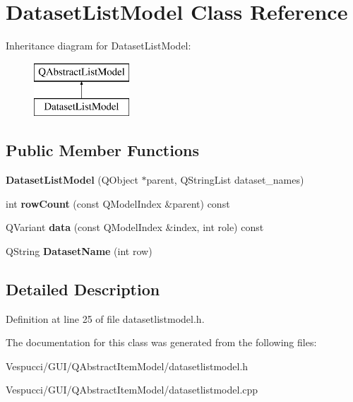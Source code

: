 \hypertarget{class_dataset_list_model}{}\section{Dataset\+List\+Model Class Reference}
\label{class_dataset_list_model}
Inheritance diagram for Dataset\+List\+Model\+:\begin{figure}[H]
\begin{center}
\leavevmode
\includegraphics[height=2.000000cm]{class_dataset_list_model}
\end{center}
\end{figure}
\subsection*{Public Member Functions}
\begin{DoxyCompactItemize}
\item 
{\bfseries Dataset\+List\+Model} (Q\+Object $\ast$parent, Q\+String\+List dataset\+\_\+names)\hypertarget{class_dataset_list_model_ac685eba08c119ddaef75e0f871b4a64d}{}\label{class_dataset_list_model_ac685eba08c119ddaef75e0f871b4a64d}

\item 
int {\bfseries row\+Count} (const Q\+Model\+Index \&parent) const \hypertarget{class_dataset_list_model_a03e20ece69419b89e5c048ec01272c94}{}\label{class_dataset_list_model_a03e20ece69419b89e5c048ec01272c94}

\item 
Q\+Variant {\bfseries data} (const Q\+Model\+Index \&index, int role) const \hypertarget{class_dataset_list_model_af7ce31fef1181dd3e4cac94c754edd05}{}\label{class_dataset_list_model_af7ce31fef1181dd3e4cac94c754edd05}

\item 
Q\+String {\bfseries Dataset\+Name} (int row)\hypertarget{class_dataset_list_model_a51b7011a46f898c09488e781c296f80c}{}\label{class_dataset_list_model_a51b7011a46f898c09488e781c296f80c}

\end{DoxyCompactItemize}


\subsection{Detailed Description}


Definition at line 25 of file datasetlistmodel.\+h.



The documentation for this class was generated from the following files\+:\begin{DoxyCompactItemize}
\item 
Vespucci/\+G\+U\+I/\+Q\+Abstract\+Item\+Model/datasetlistmodel.\+h\item 
Vespucci/\+G\+U\+I/\+Q\+Abstract\+Item\+Model/datasetlistmodel.\+cpp\end{DoxyCompactItemize}
